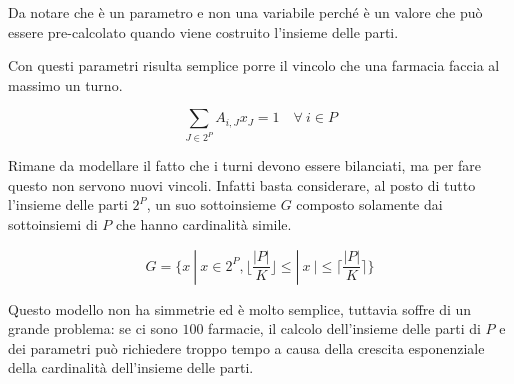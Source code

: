 \noindent Da notare che è un parametro e non una variabile perché è un valore che può essere pre-calcolato quando viene costruito l'insieme delle parti.

Con questi parametri risulta semplice porre il vincolo che una farmacia faccia al massimo un turno.

$$
\sum\limits_{J \in 2^P} A_{i,J} x_J = 1 \quad \forall \: i \in P
$$

\noindent Rimane da modellare il fatto che i turni devono essere bilanciati, ma per fare questo non servono nuovi vincoli. Infatti basta considerare, al posto di tutto l'insieme delle parti $2^P$, un suo sottoinsieme $G$ composto solamente dai sottoinsiemi di $P$ che hanno cardinalità simile.

$$
G = \bigg\{x \:  | \: x \in 2^P, \bigg\lfloor \frac{|P|}{K} \bigg\rfloor \leq |\:x\:|\leq  \bigg\lceil \frac{|P|}{K} \bigg\rceil \bigg\}
$$

\noindent Questo modello non ha simmetrie ed è molto semplice, tuttavia soffre di un grande problema: se ci sono $100$ farmacie, il calcolo dell'insieme delle parti di $P$ e dei parametri può richiedere troppo tempo a causa della crescita esponenziale della cardinalità dell'insieme delle parti.









